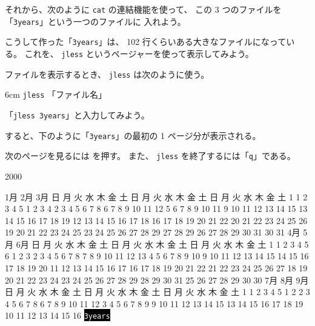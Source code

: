 \begin{progls}
%
\end{progls}

それから、次のように \texttt{cat} の連結機能を使って、
この 3 つのファイルを「\texttt{3years}」という一つのファイルに
入れよう。

\begin{progls}
%
\end{progls}

こうして作った「\texttt{3years}」は、
 102 行くらいある大きなファイルになっている。
これを、 \texttt{jless} というページャーを使って表示してみよう。

ファイルを表示するとき、 \texttt{jless} は次のように使う。
\begin{coml}{6cm}
\texttt{jless} 「ファイル名」
\end{coml}

「\texttt{jless 3years}」と入力してみよう。

\begin{progls}
\end{progls}

すると、下のように「\texttt{3years}」の最初の 1 ページ分が表示される。

次のページを見るには  を押す。
また、 \texttt{jless} を終了するには「\texttt{q}」である。

\begin{progls}
                             2000

        1月                   2月                   3月
日 月 火 水 木 金 土  日 月 火 水 木 金 土  日 月 火 水 木 金 土
                   1         1  2  3  4  5            1  2  3  4
 2  3  4  5  6  7  8   6  7  8  9 10 11 12   5  6  7  8  9 10 11
 9 10 11 12 13 14 15  13 14 15 16 17 18 19  12 13 14 15 16 17 18
16 17 18 19 20 21 22  20 21 22 23 24 25 26  19 20 21 22 23 24 25
23 24 25 26 27 28 29  27 28 29              26 27 28 29 30 31
30 31
        4月                   5月                   6月
日 月 火 水 木 金 土  日 月 火 水 木 金 土  日 月 火 水 木 金 土
                   1      1  2  3  4  5  6               1  2  3
 2  3  4  5  6  7  8   7  8  9 10 11 12 13   4  5  6  7  8  9 10
 9 10 11 12 13 14 15  14 15 16 17 18 19 20  11 12 13 14 15 16 17
16 17 18 19 20 21 22  21 22 23 24 25 26 27  18 19 20 21 22 23 24
23 24 25 26 27 28 29  28 29 30 31           25 26 27 28 29 30
30
        7月                   8月                   9月
日 月 火 水 木 金 土  日 月 火 水 木 金 土  日 月 火 水 木 金 土
                   1         1  2  3  4  5                  1  2
 2  3  4  5  6  7  8   6  7  8  9 10 11 12   3  4  5  6  7  8  9
 9 10 11 12 13 14 15  13 14 15 16 17 18 19  10 11 12 13 14 15 16
\colorbox{black}{\textcolor{white}{\texttt{3years}}}
\end{progls}
\newpage

